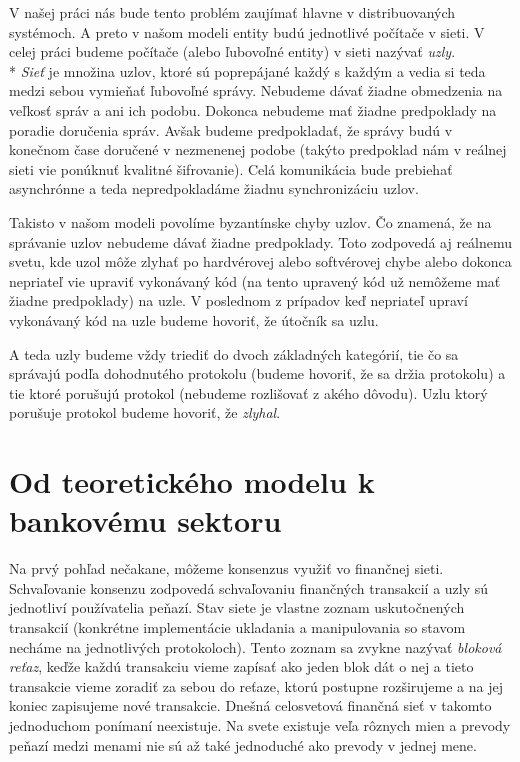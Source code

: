 V našej práci nás bude tento problém zaujímať hlavne v distribuovaných systémoch.
A preto v našom modeli entity budú jednotlivé počítače v sieti.
V celej práci budeme počítače (alebo ľubovoľné entity) v sieti nazývať 
\textit{uzly}.
\\*
\textit{Sieť} je množina uzlov, ktoré sú poprepájané každý s každým a vedia si
teda medzi sebou vymieňať ľubovoľné správy. Nebudeme dávať žiadne obmedzenia
na veľkosť správ a ani ich podobu. Dokonca nebudeme mať žiadne predpoklady na
poradie doručenia správ. Avšak budeme predpokladať, že správy budú
v konečnom čase doručené v nezmenenej podobe (takýto predpoklad nám v reálnej
sieti vie ponúknuť kvalitné šifrovanie).
Celá komunikácia bude prebiehať asynchrónne a teda nepredpokladáme žiadnu
synchronizáciu uzlov.

Takisto v našom modeli povolíme byzantínske chyby uzlov.
Čo znamená, že na správanie uzlov nebudeme dávať žiadne predpoklady.
Toto zodpovedá aj reálnemu svetu, kde uzol môže zlyhať po hardvérovej alebo
softvérovej chybe alebo dokonca nepriateľ vie upraviť vykonávaný kód (na tento
upravený kód už nemôžeme mať žiadne predpoklady) na uzle.
V poslednom z prípadov keď nepriateľ upraví vykonávaný kód na uzle budeme
hovoriť, že útočník sa  uzlu.

A teda uzly budeme vždy triediť do dvoch základných kategórií, tie čo sa správajú
podľa dohodnutého protokolu (budeme hovoriť, že sa držia protokolu) a tie ktoré
porušujú protokol (nebudeme rozlišovať z akého dôvodu). Uzlu ktorý porušuje protokol budeme hovoriť, že \textit{zlyhal}.

\section {Od teoretického modelu k bankovému sektoru}

\label{kap:theorytobank}

Na prvý pohľad nečakane, môžeme konsenzus využiť vo finančnej sieti.
Schvaľovanie konsenzu zodpovedá schvaľovaniu finančných transakcií a uzly sú
jednotliví používatelia peňazí. Stav siete je vlastne zoznam uskutočnených
transakcií (konkrétne implementácie ukladania a manipulovania so stavom necháme
na jednotlivých protokoloch).
Tento zoznam sa zvykne nazývať \textit{bloková reťaz}, keďže každú
transakciu vieme zapísať ako jeden blok dát o nej a tieto transakcie vieme
zoradiť za sebou do reťaze, ktorú postupne rozširujeme a na jej koniec
zapisujeme nové transakcie.
Dnešná celosvetová finančná sieť v takomto jednoduchom ponímaní neexistuje. Na
svete existuje veľa rôznych mien a prevody peňazí medzi menami nie sú až také
jednoduché ako prevody v jednej mene.

